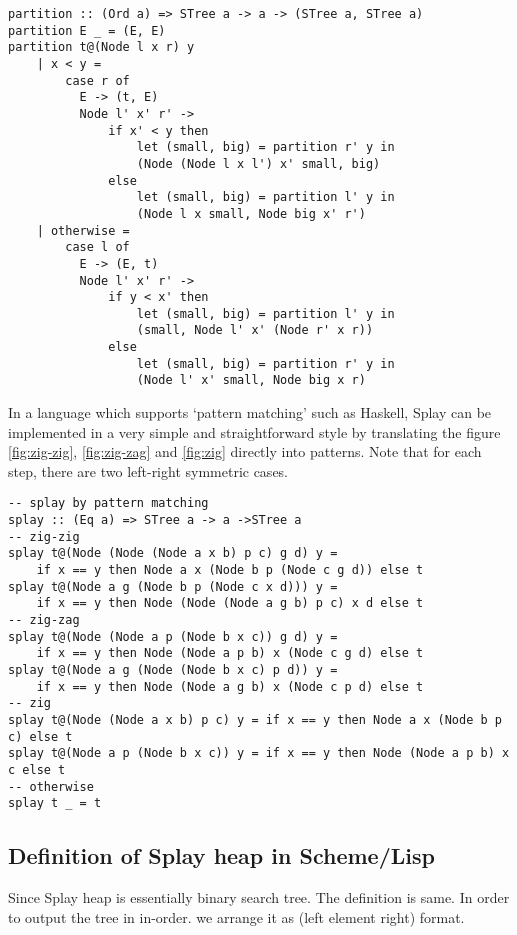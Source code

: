 \documentclass{article}
\begin{document}
\begin{lstlisting}
partition :: (Ord a) => STree a -> a -> (STree a, STree a)
partition E _ = (E, E)
partition t@(Node l x r) y 
    | x < y = 
        case r of
          E -> (t, E)
          Node l' x' r' -> 
              if x' < y then 
                  let (small, big) = partition r' y in
                  (Node (Node l x l') x' small, big)
              else 
                  let (small, big) = partition l' y in
                  (Node l x small, Node big x' r')
    | otherwise = 
        case l of
          E -> (E, t)
          Node l' x' r' ->
              if y < x' then
                  let (small, big) = partition l' y in
                  (small, Node l' x' (Node r' x r))
              else
                  let (small, big) = partition r' y in
                  (Node l' x' small, Node big x r)
\end{lstlisting}

In a language which supports `pattern matching' such as Haskell,
Splay can be implemented in a very simple and straightforward style
by translating the figure \ref{fig:zig-zig}, \ref{fig:zig-zag} and
\ref{fig:zig} directly into patterns. Note that for each step,
there are two left-right symmetric cases.

\lstset{language=Haskell}
\begin{lstlisting}
-- splay by pattern matching
splay :: (Eq a) => STree a -> a ->STree a
-- zig-zig
splay t@(Node (Node (Node a x b) p c) g d) y =
    if x == y then Node a x (Node b p (Node c g d)) else t
splay t@(Node a g (Node b p (Node c x d))) y =
    if x == y then Node (Node (Node a g b) p c) x d else t
-- zig-zag
splay t@(Node (Node a p (Node b x c)) g d) y =
    if x == y then Node (Node a p b) x (Node c g d) else t
splay t@(Node a g (Node (Node b x c) p d)) y =
    if x == y then Node (Node a g b) x (Node c p d) else t
-- zig
splay t@(Node (Node a x b) p c) y = if x == y then Node a x (Node b p c) else t
splay t@(Node a p (Node b x c)) y = if x == y then Node (Node a p b) x c else t
-- otherwise
splay t _ = t
\end{lstlisting}

\subsection*{Definition of Splay heap in Scheme/Lisp}

Since Splay heap is essentially binary search tree. The definition 
is same. In order to output the tree in in-order. we arrange it
as (left element right) format.
\end{document}
